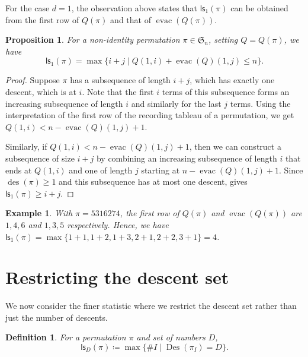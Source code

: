 \documentclass[12pt]{article}
\newcommand{\ls}{\mathsf{ls}}
\newcommand{\des}{\operatorname{des}}
\newcommand{\Des}{\operatorname{Des}}
\newcommand{\s}{\mathfrak{S}}
\newcommand{\evac}{\operatorname{evac}}
\newtheorem{definition}[theorem]{Definition}
\newtheorem{example}[theorem]{Example}
\newtheorem{proposition}[theorem]{Proposition}
\theoremstyle{definition}
\begin{document}
For the case $d = 1$, the observation above states that $\ls_1(\pi)$ can be obtained from the first row of $Q(\pi)$ and that of $\evac(Q(\pi))$.

\begin{proposition}\label{gsfromevac}
    For a non-identity permutation $\pi \in \s_n$, setting $Q = Q(\pi)$, we have
    \begin{equation*}
        \ls_1(\pi) = \operatorname{max}\{ i + j \mid Q(1, i) + \evac(Q)(1, j) \leq n\}.
    \end{equation*}
\end{proposition}

\begin{proof}
    Suppose $\pi$ has a subsequence of length $i + j$, which has exactly one descent, which is at $i$. 
    Note that the first $i$ terms of this subsequence forms an increasing subsequence of length $i$ and similarly for the last $j$ terms. 
    Using the interpretation of the first row of the recording tableau of a permutation, we get $Q(1, i) < n - \evac(Q)(1, j) + 1$.

    Similarly, if $Q(1, i) < n - \evac(Q)(1, j) + 1$, then we can construct a subsequence of size $i + j$ by combining an increasing subsequence of length $i$ that ends at $Q(1, i)$ and one of length $j$ starting at $n - \evac(Q)(1, j) + 1$. 
    Since $\des(\pi) \geq 1$ and this subsequence has at most one descent,  gives $\ls_1(\pi) \geq i + j$.
\end{proof}

\begin{example}
    With $\pi = 5 3 1 6 2 7 4$, the first row of $Q(\pi)$ and $\evac(Q(\pi))$ are $1, 4, 6$ and $1, 3, 5$ respectively. 
    Hence, we have $\ls_1(\pi) = \max\{1 + 1, 1+ 2, 1 + 3, 2 + 1, 2 + 2, 3 + 1\} = 4$.
\end{example}



\section{Restricting the descent set}\label{sec:lsD}

We now consider the finer statistic where we restrict the descent set rather than just the number of descents.

\begin{definition}
    For a permutation $\pi$ and set of numbers $D$,
    \begin{equation*}
        \ls_D(\pi) \coloneqq \max \{\#I \mid \Des(\pi_I) = D\}.
    \end{equation*}
\end{definition}
\end{document}

